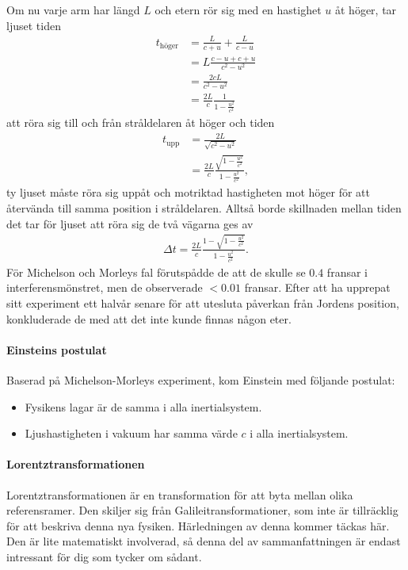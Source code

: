 Om nu varje arm har längd $L$ och etern rör sig med en hastighet $u$ åt höger, tar ljuset tiden
\begin{align*}
	t_{\text{höger}} &= \frac{L}{c + u} + \frac{L}{c - u} \\
	                 &= L\frac{c - u + c + u}{c^{2} - u^{2}} \\
	                 &= \frac{2cL}{c^{2} - u^{2}} \\
	                 &= \frac{2L}{c}\frac{1}{1 - \frac{u^{2}}{c^{2}}}
\end{align*}
att röra sig till och från stråldelaren åt höger och tiden
\begin{align*}
	t_{\text{upp}} &= \frac{2L}{\sqrt{c^{2} - u^{2}}} \\
	               &= \frac{2L}{c}\frac{\sqrt{1 - \frac{u^{2}}{c^{2}}}}{1 - \frac{u^{2}}{c^{2}}},
\end{align*}
ty ljuset måste röra sig uppåt och motriktad hastigheten mot höger för att återvända till samma position i stråldelaren. Alltså borde skillnaden mellan tiden det tar för ljuset att röra sig de två vägarna ges av
\begin{align*}
	\Delta t = \frac{2L}{c}\frac{1 - \sqrt{1 - \frac{u^{2}}{c^{2}}}}{1 - \frac{u^{2}}{c^{2}}}.
\end{align*}
För Michelson och Morleys fal förutspådde de att de skulle se $0.4$ fransar i interferensmönstret, men de observerade $< 0.01$ fransar. Efter att ha upprepat sitt experiment ett halvår senare för att utesluta påverkan från Jordens position, konkluderade de med att det inte kunde finnas någon eter.

\paragraph{Einsteins postulat}
Baserad på Michelson-Morleys experiment, kom Einstein med följande postulat:
\begin{itemize}
	\item Fysikens lagar är de samma i alla inertialsystem.
	\item Ljushastigheten i vakuum har samma värde $c$ i alla inertialsystem.
\end{itemize}

\paragraph{Lorentztransformationen}
Lorentztransformationen är en transformation för att byta mellan olika referensramer. Den skiljer sig från Galileitransformationer, som inte är tillräcklig för att beskriva denna nya fysiken. Härledningen av denna kommer täckas här. Den är lite matematiskt involverad, så denna del av sammanfattningen är endast intressant för dig som tycker om sådant.

